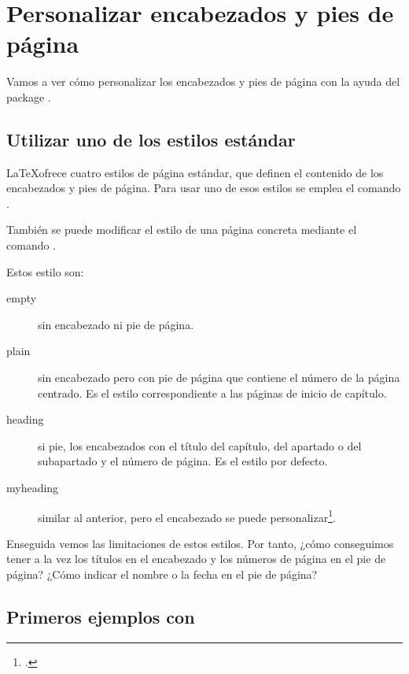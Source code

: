 \chapter{Personalizar encabezados y pies de página}\label{entete}

\begin{intro}
Vamos a ver cómo personalizar los encabezados y pies de página con la ayuda del package .
\end{intro}


\section{Utilizar uno de los estilos estándar}\label{stylesentete}

\LaTeX ofrece cuatro estilos de página estándar, que definen el contenido de los encabezados y pies de página. Para usar uno de esos estilos se emplea el comando .


También se puede modificar el estilo de una página concreta mediante el comando .

Estos estilo son:
\begin{description}
\item[empty] sin encabezado ni pie de página.
\item[plain] sin encabezado pero con pie de página que contiene el número de la página centrado. Es el estilo correspondiente a las páginas de inicio de capítulo. 
\item[heading] si pie, los encabezados con el título del capítulo, del apartado o del subapartado y el número de página. Es el estilo por defecto. \label{styleentetes}
\item[myheading] similar al anterior, pero el encabezado se puede personalizar\footcite[Obtuvimos esta información del manual de][\pno~222, que no explica cómo hacerlo]{latex_companion}.
\end{description}



Enseguida vemos las limitaciones de estos estilos. Por tanto, ¿cómo conseguimos tener a la vez los títulos en el encabezado y los números de página en el pie de página? ¿Cómo indicar el nombre o la fecha en el pie de página?

\section{Primeros ejemplos con }

